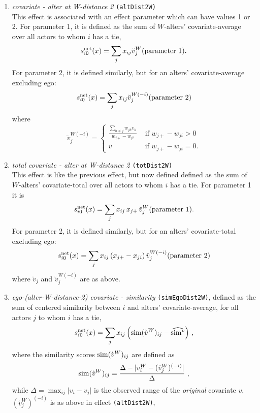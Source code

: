 \documentclass[a4paper,fleqn,11pt]{article}
\newcommand{\+}{\, + \,}
\newcommand{\vit}{\theenumi}
\newcounter{savenumi}
\begin{document}
\begin{enumerate}
\setcounter{enumi}{\value{savenumi}}

\item \emph{covariate - alter at W-distance 2} \texttt{(altDist2W)} \\ %
      This effect is associated with an effect parameter
      which can have values 1 or 2.
      For parameter 1, it is
      defined as the sum of $W$-alters' covariate-average over all actors
      to whom $i$ has a tie,
\[
 s^{\rm net}_{i\vit}(x) = \sum_j x_{ij} \breve v_j^W \hfill (\text{parameter 1}). \hfill
\]
      For parameter 2, it is defined similarly,
      but for an alters' covariate-average excluding
      ego:
\[
 s^{\rm net}_{i\vit}(x) = \sum_j x_{ij} \breve v_j^{W(-i)} \hfill (\text{parameter 2}) \hfill
\]
      where
\begin{equation}
  \breve v_j^{W(-i)} = \left\{\begin{array}{ll} \displaystyle
         \frac{\sum_{h \neq j} w_{jh}v_h}{w_{j+} - w_{ji}}  &  \text{ if } w_{j+} - w_{ji} > 0     \\
         \bar v                               &  \text{ if } w_{j+}- w_{ji} = 0  .
  \end{array}   \right.
\end{equation}

\item \emph{total covariate - alter at W-distance 2} \texttt{(totDist2W)} \\
      This effect is like the previous effect, but now defined
      defined as the sum of $W$-alters' covariate-total over all actors
      to whom $i$ has a tie. For parameter 1 it is
\[
 s^{\rm net}_{i\vit}(x) = \sum_j x_{ij}\, x_{j+} \, \breve v_j^W \hfill (\text{parameter 1}). \hfill
\]
      For parameter 2, it is defined similarly,
      but for an alters' covariate-total excluding
      ego:
\[
 s^{\rm net}_{i\vit}(x) = \sum_j x_{ij} \, (x_{j+}  - x_{ji}) \,
               \breve v_j^{W(-i)} \hfill (\text{parameter 2}) \hfill
\]
      where $ \breve v_j$ and $ \breve v_j^{W(-i)}$ are as above.

\item \emph{ego-(alter-W-distance-2) covariate - similarity} \texttt{(simEgoDist2W)},
      defined as the sum of centered similarity  between $i$
      and alters' covariate-average, for all actors
      $j$ to whom $i$ has a tie,
\[
 s^{\rm net}_{i\vit}(x) = \sum_j x_{ij}\, \Big({\rm sim}(\grave v^W)_{ij}
  - \widehat{{\rm sim}^v}\Big) \ ,
\]
 where the similarity scores ${\rm sim}(\grave v^W)_{ij}$ are defined as
\[
{\rm sim}(\grave v^W)_{ij}=
 \frac{\Delta-\vert  v^W_i - ( \breve v^W_j)^{(-i)} \vert}{\Delta} \ ,
\]
 while
 $\Delta=\max_{ij}\vert v_i - v_j \vert$ is the observed range of the
 \emph{original} covariate $v$,
 $ (\breve v^W_j)^{(-i)}$ is as above in effect \texttt{(altDist2W)},


\end{enumerate}
\end{document}
